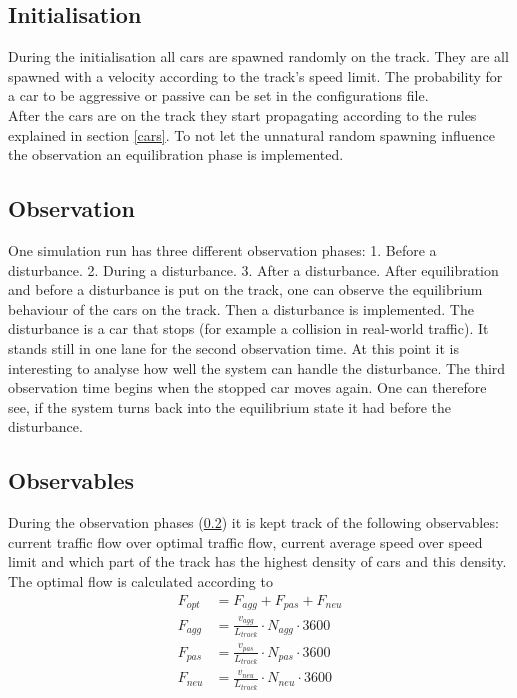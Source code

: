 \documentclass[11pt,a4paper,twocolumn]{article}
\begin{document}
\subsection{Initialisation} \label{Initialisation}
During the initialisation all cars are spawned randomly on the track. They are all spawned with a velocity according to the track's speed limit. The probability for a car to be aggressive or passive can be set in the configurations file. \\
After the cars are on the track they start propagating according to the rules explained in section \ref{cars}. To not let the unnatural random spawning influence the observation an equilibration phase is implemented.

\subsection{Observation} \label{Observation}
One simulation run has three different observation phases: 1. Before a disturbance. 2. During a disturbance. 3. After a disturbance.
After equilibration and before a disturbance is put on the track, one can observe the equilibrium behaviour of the cars on the track. Then a disturbance is implemented. The disturbance is a car that stops (for example a collision in real-world traffic). It stands still in one lane for the second observation time. At this point it is interesting to analyse how well the system can handle the disturbance. The third observation time begins when the stopped car moves again. One can therefore see, if the system turns back into the equilibrium state it had before the disturbance. \\

\subsection{Observables}
During the observation phases (\ref{Observation}) it is kept track of the following observables: current traffic flow over optimal traffic flow, current average speed over speed limit and which part of the track has the highest density of cars and this density. \\
The optimal flow is calculated according to
\begin{align*}
F_{opt} &= F_{agg} + F_{pas} + F_{neu} \\
F_{agg} &= \frac{v_{agg}}{L_{track}} \cdot N_{agg} \cdot 3600 \\
F_{pas} &= \frac{v_{pas}}{L_{track}} \cdot N_{pas} \cdot 3600 \\
F_{neu} &= \frac{v_{neu}}{L_{track}} \cdot N_{neu} \cdot 3600 \\
\end{align*}
\end{document}
